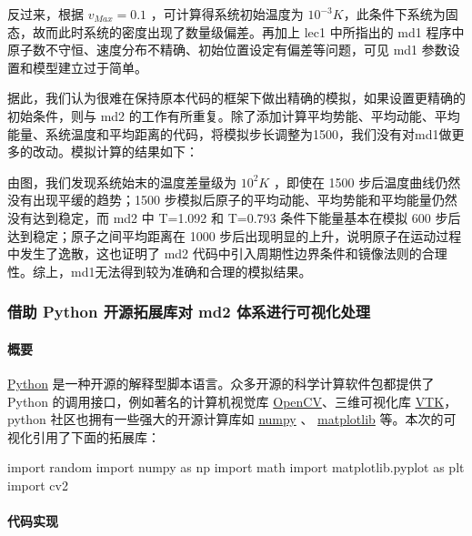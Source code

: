 \documentclass[
]{article}
\newenvironment{Shaded}{}{}
\newcommand{\ImportTok}[1]{#1}
\newcommand{\NormalTok}[1]{#1}
\begin{document}
反过来，根据 \(v_{Max}=0.1\) ，可计算得系统初始温度为
\(10^{-3}K\)，此条件下系统为固态，故而此时系统的密度出现了数量级偏差。再加上
lec1 中所指出的 md1
程序中原子数不守恒、速度分布不精确、初始位置设定有偏差等问题，可见 md1
参数设置和模型建立过于简单。

据此，我们认为很难在保持原本代码的框架下做出精确的模拟，如果设置更精确的初始条件，则与
md2
的工作有所重复。除了添加计算平均势能、平均动能、平均能量、系统温度和平均距离的代码，将模拟步长调整为1500，我们没有对md1做更多的改动。模拟计算的结果如下：

由图，我们发现系统始末的温度差量级为 \(10^2K\) ，即使在 1500
步后温度曲线仍然没有出现平缓的趋势；1500
步模拟后原子的平均动能、平均势能和平均能量仍然没有达到稳定，而 md2 中
T=1.092 和 T=0.793 条件下能量基本在模拟 600
步后达到稳定；原子之间平均距离在 1000
步后出现明显的上升，说明原子在运动过程中发生了逸散，这也证明了 md2
代码中引入周期性边界条件和镜像法则的合理性。综上，md1无法得到较为准确和合理的模拟结果。

\hypertarget{header-n56}{%
\subsubsection{借助 Python 开源拓展库对 md2
体系进行可视化处理}\label{header-n56}}

\hypertarget{header-n57}{%
\paragraph{概要}\label{header-n57}}

\href{https://www.python.org/}{Python}
是一种开源的解释型脚本语言。众多开源的科学计算软件包都提供了 Python
的调用接口，例如著名的计算机视觉库
\href{https://opencv.org/}{OpenCV}、三维可视化库
\href{https://vtk.org/}{VTK}，python 社区也拥有一些强大的开源计算库如
\href{https://numpy.org/}{numpy} 、
\href{https://matplotlib.org/index.html}{matplotlib}
等。本次的可视化引用了下面的拓展库：

\begin{Shaded}
\begin{Highlighting}[]
\ImportTok{import}\NormalTok{ random}
\ImportTok{import}\NormalTok{ numpy }\ImportTok{as}\NormalTok{ np}
\ImportTok{import}\NormalTok{ math}
\ImportTok{import}\NormalTok{ matplotlib.pyplot }\ImportTok{as}\NormalTok{ plt}
\ImportTok{import}\NormalTok{ cv2}
\end{Highlighting}
\end{Shaded}

\hypertarget{header-n61}{%
\paragraph{代码实现}\label{header-n61}}
\end{document}
